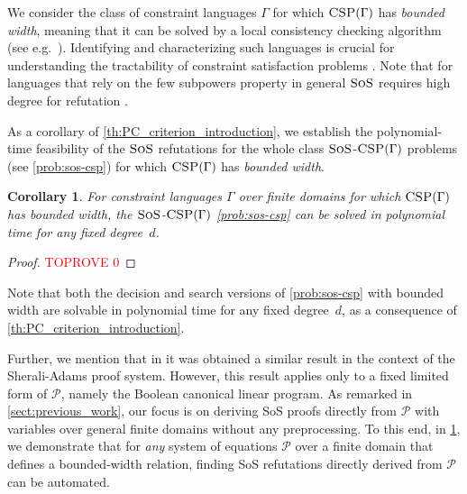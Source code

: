 \documentclass[11pt]{article}
\newcommand{\sos}{\text{\sc{SoS}}}
\newcommand{\CSP}{\textsc{CSP}}
\newcommand{\1}{\textbf{1}}
\newtheorem{corollary}[theorem]{Corollary}
\begin{document}
We consider the class of constraint languages $\Gamma$ for which $\CSP(\Gamma)$ has \emph{bounded width}, meaning that it can be solved by a local consistency checking algorithm (see e.g.~\cite{BartoK14,barto_et_al:DFU:2017:6959}). Identifying and characterizing such languages is crucial for understanding the tractability of constraint satisfaction problems \cite{BartoK14,barto_et_al:DFU:2017:6959}. Note that for languages that rely on the {few subpowers property} in general $\sos$ requires high degree for refutation \cite{barto_et_al:DFU:2017:6959,BartoK14, GRIGORIEV2001613}.

As a corollary of \cref{th:PC_criterion_introduction}, we establish the polynomial-time feasibility of the $\sos$ refutations for the whole class $\sos$-$\CSP(\Gamma)$ problems (see \cref{prob:sos-csp}) for which $\CSP(\Gamma)$ has \emph{bounded width}. \begin{corollary}\label{th:BW}
    For constraint languages $\Gamma$ over finite domains for which $\CSP(\Gamma)$ has \emph{bounded width}, the $\sos$-$\CSP(\Gamma)$ \cref{prob:sos-csp} can be solved in polynomial time for any fixed degree~$d$.
\end{corollary}
\begin{proof}\textcolor{red}{TOPROVE 0}\end{proof}

Note that both the decision and search versions of \cref{prob:sos-csp} with bounded width are solvable in polynomial time for any fixed degree~$d$, as a consequence of \cref{th:PC_criterion_introduction}.

Further, we mention that in \cite{ThapperZ18} it was obtained a similar result in the context of the Sherali-Adams proof system. However, this result applies only to a fixed limited form of $\mathcal{P}$, namely the Boolean canonical linear program. As remarked in \cref{sect:previous_work}, our focus is on deriving SoS proofs directly from $\mathcal{P}$ with variables over general finite domains without any preprocessing. To this end, in \cref{th:BW}, we demonstrate that for \emph{any} system of equations $\mathcal{P}$ over a finite domain that defines a bounded-width relation, finding SoS refutations directly derived from $\mathcal{P}$ can be automated.
\end{document}
